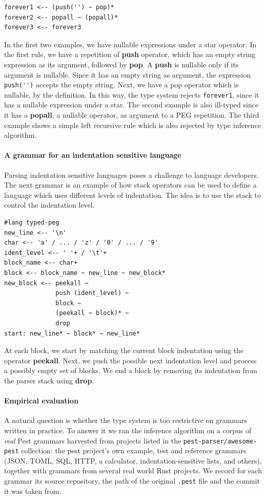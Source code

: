 \documentclass[preprint,12pt]{elsarticle}
\theoremstyle{definition}
\begin{document}
\begin{verbatim}
forever1 <-- (push('') ~ pop)*
forever2 <-- popall ~ (popall)*
forever3 <-- forever3
\end{verbatim}
In the first two examples, we have nullable expressions under a star
operator. In the first rule, we have a repetition of \textbf{push} operator, which
has an empty string expression as its argument, followed by \textbf{pop}.
A \textbf{push} is nullable only if its argument is nullable. Since it
has an empty string as argument, the expression \verb|push('')|
accepts the empty string. Next, we have a pop operator which is nullable,
by the definition. In this way, the type system rejects \verb|forever1|,
since it has a nullable expression under a star. The second example is also
ill-typed since it has a \textbf{popall}, a nullable operator, as
argument to a PEG repetition.
The third example shows a simple left recursive rule
which is also rejected by type inference algorithm.

\paragraph{A grammar for an indentation sensitive language}

Parsing indentation sensitive languages poses a challenge to language developers.
The next grammar is an example of how stack operators can be used to define
a language which uses different levels of indentation. The idea is to use the
stack to control the indentation level.
\begin{verbatim}
#lang typed-peg
new_line <-- '\n'
char <-- 'a' / ... / 'z' / '0' / ... / '9'
ident_level <-- ' '+ / '\t'+
block_name <-- char+
block <-- block_name ~ new_line ~ new_block*
new_block <-- peekall ~
              push (ident_level) ~
              block ~
              (peekall ~ block)* ~
              drop
start: new_line* ~ block* ~ new_line*
\end{verbatim}
At each block, we start by matching the current block indentation
using the operator \textbf{peekall}. Next, we push the possible
next indentation level and process a possibly empty set of blocks.
We end a block by removing its indentation from the parser stack
using \textbf{drop}.

\paragraph{Empirical evaluation} A natural question is whether the type system is
too restrictive on grammars written in practice. To answer it we ran the
inference algorithm on a corpus of \emph{real} Pest grammars harvested from
projects listed in the \texttt{pest-parser/awesome-pest} collection: the pest
project's own example, test and reference grammars (JSON, TOML, SQL, HTTP, a
calculator, indentation-sensitive lists, and others), together with grammars from
several real world Rust projects.
We record for each grammar its source repository, the path of the original
\texttt{.pest} file and the commit it was taken from.
\end{document}
